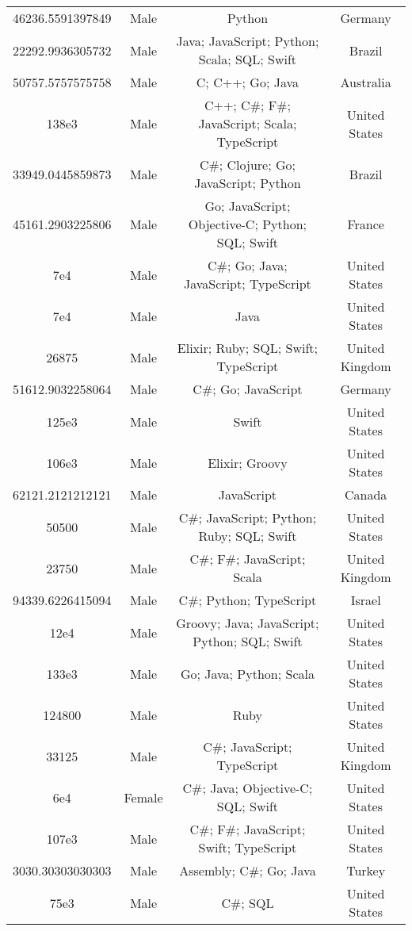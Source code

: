 \begin{center}
\begin{tabular}{ |c|c|c|c| }
46236.5591397849  &  Male  &  Python  &  Germany  \\ 
22292.9936305732  &  Male  &  Java; JavaScript; Python; Scala; SQL; Swift  &  Brazil  \\ 
50757.5757575758  &  Male  &  C; C++; Go; Java  &  Australia  \\ 
138e3  &  Male  &  C++; C\#; F\#; JavaScript; Scala; TypeScript  &  United States  \\ 
33949.0445859873  &  Male  &  C\#; Clojure; Go; JavaScript; Python  &  Brazil  \\ 
45161.2903225806  &  Male  &  Go; JavaScript; Objective-C; Python; SQL; Swift  &  France  \\ 
7e4  &  Male  &  C\#; Go; Java; JavaScript; TypeScript  &  United States  \\ 
7e4  &  Male  &  Java  &  United States  \\ 
26875  &  Male  &  Elixir; Ruby; SQL; Swift; TypeScript  &  United Kingdom  \\ 
51612.9032258064  &  Male  &  C\#; Go; JavaScript  &  Germany  \\ 
125e3  &  Male  &  Swift  &  United States  \\ 
106e3  &  Male  &  Elixir; Groovy  &  United States  \\ 
62121.2121212121  &  Male  &  JavaScript  &  Canada  \\ 
50500  &  Male  &  C\#; JavaScript; Python; Ruby; SQL; Swift  &  United States  \\ 
23750  &  Male  &  C\#; F\#; JavaScript; Scala  &  United Kingdom  \\ 
94339.6226415094  &  Male  &  C\#; Python; TypeScript  &  Israel  \\ 
12e4  &  Male  &  Groovy; Java; JavaScript; Python; SQL; Swift  &  United States  \\ 
133e3  &  Male  &  Go; Java; Python; Scala  &  United States  \\ 
124800  &  Male  &  Ruby  &  United States  \\ 
33125  &  Male  &  C\#; JavaScript; TypeScript  &  United Kingdom  \\ 
6e4  &  Female  &  C\#; Java; Objective-C; SQL; Swift  &  United States  \\ 
107e3  &  Male  &  C\#; F\#; JavaScript; Swift; TypeScript  &  United States  \\ 
3030.30303030303  &  Male  &  Assembly; C\#; Go; Java  &  Turkey  \\ 
75e3  &  Male  &  C\#; SQL  &  United States  \\ 

\end{tabular}
\end{center}
